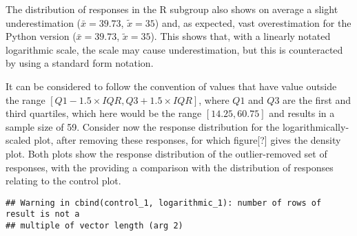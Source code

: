 \documentclass[
]{article}
\newenvironment{Shaded}{\begin{snugshade}}{\end{snugshade}}
\newcommand{\DecValTok}[1]{\textcolor[rgb]{0.00,0.00,0.81}{#1}}
\newcommand{\KeywordTok}[1]{\textcolor[rgb]{0.13,0.29,0.53}{\textbf{#1}}}
\newcommand{\NormalTok}[1]{#1}
\newcommand{\StringTok}[1]{\textcolor[rgb]{0.31,0.60,0.02}{#1}}
\begin{document}
The distribution of responses in the R subgroup also shows on average a
slight underestimation (\(\bar{x}= 39.73\), \(\tilde{x} = 35\)) and, as
expected, vast overestimation for the Python version
(\(\bar{x}= 39.73\), \(\tilde{x} = 35\)). This shows that, with a
linearly notated logarithmic scale, the scale may cause underestimation,
but this is counteracted by using a standard form notation.

It can be considered to follow the convention of values that have value
outside the range \([Q1 - 1.5 \times IQR, Q3 + 1.5 \times IQR]\), where
\(Q1\) and \(Q3\) are the first and third quartiles, which here would be
the range \([14.25, 60.75]\) and results in a sample size of 59.
Consider now the response distribution for the logarithmically-scaled
plot, after removing these responses, for which figure{[}?{]} gives the
density plot. Both plots show the response distribution of the
outlier-removed set of responses, with the providing a comparison with
the distribution of responses relating to the control plot.

\begin{Shaded}
\end{Shaded}

\begin{verbatim}
## Warning in cbind(control_1, logarithmic_1): number of rows of result is not a
## multiple of vector length (arg 2)
\end{verbatim}
\end{document}
